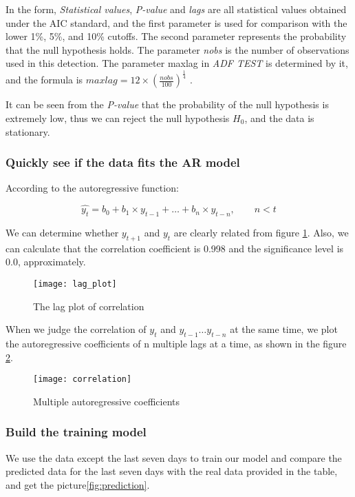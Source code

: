 \documentclass{mcmthesis}
\begin{document}
In the form, \textit{Statistical values}, \textit{P-value} and \textit{lags} are all statistical values obtained under the AIC standard, and the first parameter is used for comparison with the lower 1\%, 5\%, and 10\% cutoffs.
The second parameter represents the probability that the null hypothesis holds.
The parameter \textit{nobs} is the number of observations used in this detection.
The parameter maxlag in \textit{ADF TEST} is determined by it, and the formula is $ \displaystyle maxlag = 12 \times ( \frac{nobs}{100}) ^\frac{1}{4} $ .

It can be seen from the \textit{P-value} that the probability of the null hypothesis is extremely low, thus we can reject the null hypothesis $H_0$, and the data is stationary.

\subsubsection{Quickly see if the data fits the AR model}
  According to the autoregressive function:

  \begin{equation}
    \hat{y_t} = b_0 + b_1 \times y_{t - 1} + \ldots + b_n \times y_{t - n}, \qquad n < t
  \end{equation}

  We can determine whether $ y_{t + 1}$ and $ y_t $ are clearly related from figure \ref{fig:lag_plot}. Also, we can calculate that the correlation coefficient is 0.998 and the significance level is 0.0, approximately.

  \begin{figure}[H]
    \centering
    \texttt{[image: lag\_plot]}
    \caption{The lag plot of correlation}
    \label{fig:lag_plot}
  \end{figure}

  When we judge the correlation of $ y_t$ and $ y_{t - 1} \ldots y_{t - n} $ at the same time, we plot the autoregressive coefficients of n multiple lags at a time, as shown in the figure \ref{fig:correlation}.

  \begin{figure}[H]
    \centering
    \texttt{[image: correlation]}
    \caption{Multiple autoregressive coefficients}
    \label{fig:correlation}
  \end{figure}

\subsubsection{Build the training model}
We use the data except the last seven days to train our model and compare the predicted data for the last seven days with the real data provided in the table, and get the picture\ref{fig:prediction}.
\end{document}
